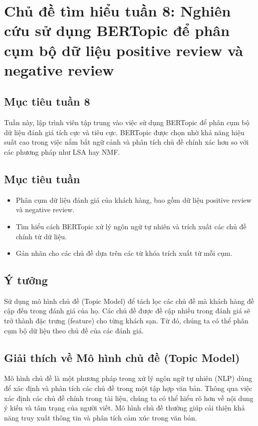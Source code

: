 \section{Chủ đề tìm hiểu tuần 8: Nghiên cứu sử dụng BERTopic để phân cụm bộ dữ liệu positive review và negative review}

\subsection{Mục tiêu tuần 8}
Tuần này, lập trình viên tập trung vào việc sử dụng BERTopic để phân cụm bộ dữ liệu đánh giá tích cực và tiêu cực. BERTopic được chọn nhờ khả năng hiệu suất cao trong việc nắm bắt ngữ cảnh và phân tích chủ đề chính xác hơn so với các phương pháp như LSA hay NMF.

\subsection{Mục tiêu tuần}
\begin{itemize}
    \item Phân cụm dữ liệu đánh giá của khách hàng, bao gồm dữ liệu positive review và negative review.
    \item Tìm hiểu cách BERTopic xử lý ngôn ngữ tự nhiên và trích xuất các chủ đề chính từ dữ liệu.
    \item Gán nhãn cho các chủ đề dựa trên các từ khóa trích xuất từ mỗi cụm.
\end{itemize}

\subsection{Ý tưởng}
Sử dụng mô hình chủ đề (Topic Model) để tách lọc các chủ đề mà khách hàng đề cập đến trong đánh giá của họ. Các chủ đề được đề cập nhiều trong đánh giá sẽ trở thành đặc trưng (feature) cho từng khách sạn. Từ đó, chúng ta có thể phân cụm bộ dữ liệu theo chủ đề của các đánh giá.

\subsection{Giải thích về Mô hình chủ đề (Topic Model)}
Mô hình chủ đề là một phương pháp trong xử lý ngôn ngữ tự nhiên (NLP) dùng để xác định và phân tích các chủ đề trong một tập hợp văn bản. Thông qua việc xác định các chủ đề chính trong tài liệu, chúng ta có thể hiểu rõ hơn về nội dung ý kiến và tâm trạng của người viết. Mô hình chủ đề thường giúp cải thiện khả năng truy xuất thông tin và phân tích cảm xúc trong văn bản.

